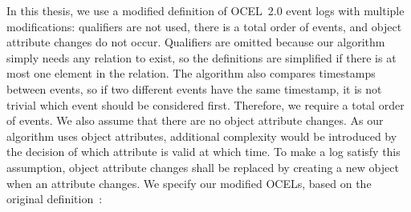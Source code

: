     
    In this thesis, we use a modified definition of OCEL~2.0 event logs with multiple modifications: qualifiers are not used, there is a total order of events, and object attribute changes do not occur.
    Qualifiers are omitted because our algorithm simply needs any relation to exist, so the definitions are simplified if there is at most one element in the relation.
    The algorithm also compares timestamps between events, so if two different events have the same timestamp, it is not trivial which event should be considered first.
    Therefore, we require a total order of events.
    We also assume that there are no object attribute changes.
    As our algorithm uses object attributes, additional complexity would be introduced by the decision of which attribute is valid at which time.
    To make a log satisfy this assumption, object attribute changes shall be replaced by creating a new object when an attribute changes.
    We specify our modified OCELs, based on the original definition~\autocite{ocel20}:
    
